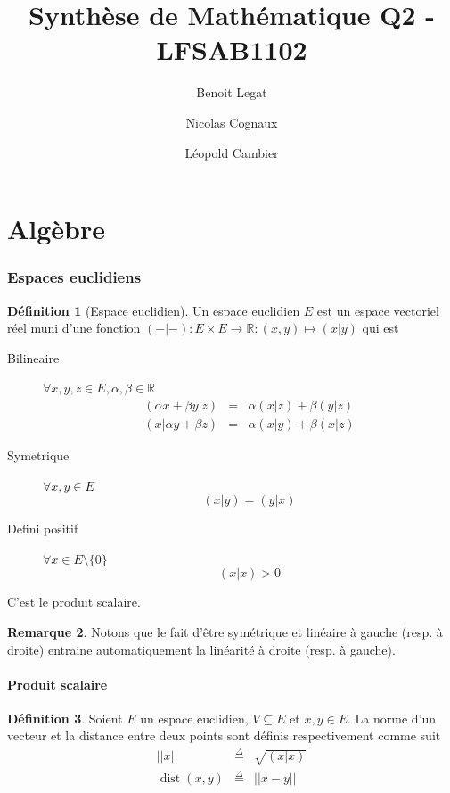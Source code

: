 \documentclass[11pt,a4paper]{article}
\title{Synthèse de Mathématique Q2 - LFSAB1102}
\author{Benoit Legat \and Nicolas Cognaux \and Léopold Cambier}
\theoremstyle{definition}
\newtheorem{mydef}{Définition}[section]
\newtheorem{myrem}[mydef]{Remarque}
\DeclareMathOperator{\dist}{dist}
\begin{document}
\maketitle

\part{Algèbre}

\section{Espaces euclidiens}
\begin{mydef}[Espace euclidien]
	Un espace euclidien $E$ est un espace vectoriel réel muni d'une fonction
	$(-|-) : E \times E \to \mathbb{R} : (x, y) \mapsto (x|y)$ qui est
	\begin{description}
		\item[Bilineaire]
			$\forall x, y, z \in E, \alpha, \beta \in \mathbb{R}$
			\begin{eqnarray*}
				(\alpha x + \beta y | z) & = & \alpha (x | z) + \beta (y | z)\\
				(x | \alpha y + \beta z) & = & \alpha (x | y) + \beta (x | z)
			\end{eqnarray*}
		\item[Symetrique]
			$\forall x,y \in E$
			$$(x|y) = (y|x)$$
		\item[Defini positif]
			$\forall x \in E \setminus \{0\}$
			$$(x|x) > 0$$
	\end{description}
	C'est le produit scalaire.
\end{mydef}

\begin{myrem}
	Notons que le fait d'être symétrique et linéaire à gauche (resp. à droite) entraine automatiquement la linéarité à droite (resp. à gauche).
\end{myrem}


\subsection{Produit scalaire}

\begin{mydef}
	Soient $E$ un espace euclidien, $V \subseteq E$ et $x,y \in E$.
	La norme d'un vecteur et la distance entre deux points sont définis respectivement comme suit
	\begin{eqnarray*}
		||x|| & \stackrel{\Delta}{=} & \sqrt{(x|x)}\\
		\dist(x, y) & \stackrel{\Delta}{=} & ||x - y||\\
	\end{eqnarray*}
\end{mydef}
\end{document}
